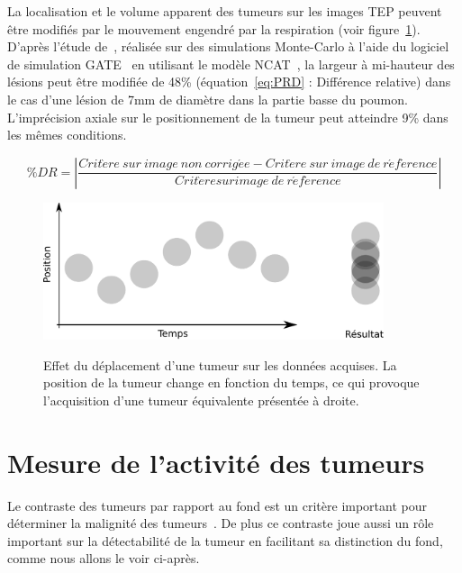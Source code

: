 La localisation et le volume apparent des tumeurs sur les images TEP peuvent être modifiés par le mouvement engendré par la respiration (voir figure~\ref{fig:effetMvt}). D'après l'étude de~\cite{lamare2007respiratory}, réalisée sur des simulations Monte-Carlo à l'aide du logiciel de simulation GATE~\cite{jan2004gate} en utilisant le modèle NCAT~\cite{segars2001These}, la largeur à mi-hauteur des lésions peut être modifiée de 48\% (équation~\ref{eq:PRD} : Différence relative) dans le cas d'une lésion de 7mm de diamètre dans la partie basse du poumon. L'imprécision axiale sur le positionnement de la tumeur peut atteindre 9\% dans les mêmes conditions.

\begin{equation}
\%DR= \left| \frac{Crit\grave{e}re~sur~image~non~corrig\acute{e}e - Crit\grave{e}re~sur~image~de~r\acute{e}f\acute{e}rence}{Crit\grave{e}re sur image~de~r\acute{e}f\acute{e}rence} \right|
\label{eq:PRD}
\end{equation}


\begin{figure}[h!]
    \begin{center}
            \includegraphics[width=10cm]{images/moyennageImage} \\
    \end{center}
    \caption[Effet du déplacement d'une tumeur sur les données acquises]{Effet du déplacement d'une tumeur sur les données acquises. La position de la tumeur change en fonction du temps, ce qui provoque l'acquisition d'une tumeur équivalente présentée à droite.}
    \label{fig:effetMvt}
\end{figure}


\section{Mesure de l'activité des tumeurs}

Le contraste des tumeurs par rapport au fond est un critère important pour déterminer la malignité des tumeurs~\cite{dimitrakopoulou2002role, krak2005effects}. De plus ce contraste joue aussi un rôle important sur la détectabilité de la tumeur en facilitant sa distinction du fond, comme nous allons le voir ci-après.


